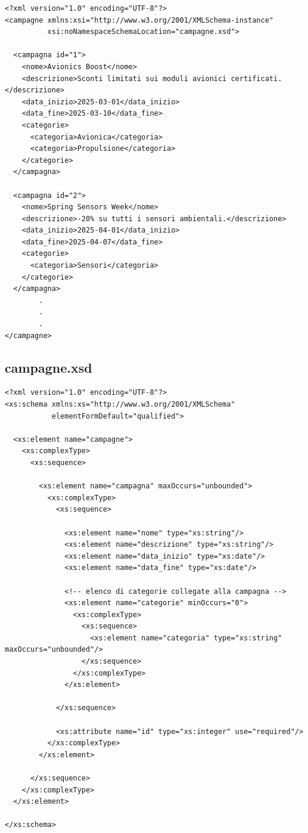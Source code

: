 \documentclass[a4paper,12pt]{report}
\begin{document}
{\footnotesize
\begin{lstlisting}
<?xml version="1.0" encoding="UTF-8"?>
<campagne xmlns:xsi="http://www.w3.org/2001/XMLSchema-instance"
          xsi:noNamespaceSchemaLocation="campagne.xsd">

  <campagna id="1">
    <nome>Avionics Boost</nome>
    <descrizione>Sconti limitati sui moduli avionici certificati.</descrizione>
    <data_inizio>2025-03-01</data_inizio>
    <data_fine>2025-03-10</data_fine>
    <categorie>
      <categoria>Avionica</categoria>
      <categoria>Propulsione</categoria>
    </categorie>
  </campagna>

  <campagna id="2">
    <nome>Spring Sensors Week</nome>
    <descrizione>-20% su tutti i sensori ambientali.</descrizione>
    <data_inizio>2025-04-01</data_inizio>
    <data_fine>2025-04-07</data_fine>
    <categorie>
      <categoria>Sensori</categoria>
    </categorie>
  </campagna>
        .
        .
        .
</campagne>
\end{lstlisting}
}

\subsection*{campagne.xsd}

{\footnotesize
\begin{lstlisting}
<?xml version="1.0" encoding="UTF-8"?>
<xs:schema xmlns:xs="http://www.w3.org/2001/XMLSchema"
           elementFormDefault="qualified">

  <xs:element name="campagne">
    <xs:complexType>
      <xs:sequence>

        <xs:element name="campagna" maxOccurs="unbounded">
          <xs:complexType>
            <xs:sequence>

              <xs:element name="nome" type="xs:string"/>
              <xs:element name="descrizione" type="xs:string"/>
              <xs:element name="data_inizio" type="xs:date"/>
              <xs:element name="data_fine" type="xs:date"/>

              <!-- elenco di categorie collegate alla campagna -->
              <xs:element name="categorie" minOccurs="0">
                <xs:complexType>
                  <xs:sequence>
                    <xs:element name="categoria" type="xs:string"                       maxOccurs="unbounded"/>
                  </xs:sequence>
                </xs:complexType>
              </xs:element>

            </xs:sequence>

            <xs:attribute name="id" type="xs:integer" use="required"/>
          </xs:complexType>
        </xs:element>

      </xs:sequence>
    </xs:complexType>
  </xs:element>

</xs:schema>

\end{lstlisting}
}
\end{document}

